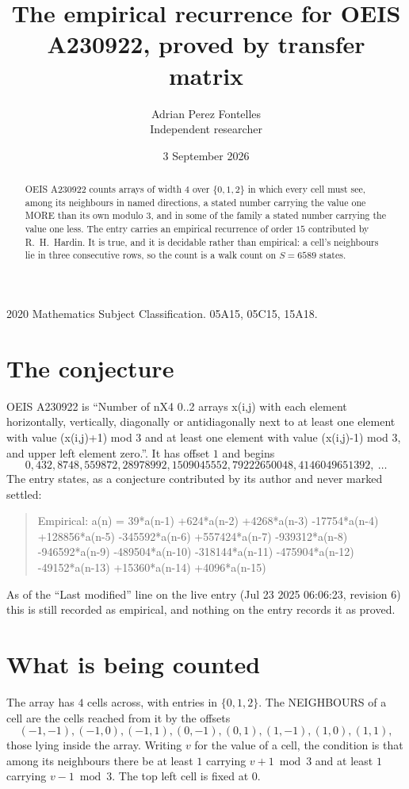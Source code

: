 \documentclass[11pt,a4paper]{article}
\title{The empirical recurrence for OEIS A230922, proved by transfer matrix}
\author{Adrian Perez Fontelles\\ \small Independent researcher}
\date{3 September 2026}
\theoremstyle{plain}
\theoremstyle{definition}
\begin{document}
\maketitle

\begin{abstract}
OEIS A230922 counts arrays of width $4$ over $\{0,1,2\}$ in which every cell must see, among its
neighbours in named directions, a stated number carrying the value one MORE than its own
modulo $3$, and in some of the family a stated number carrying the value one less. The entry
carries an empirical recurrence of order $15$ contributed by R.~H.~Hardin. It is true, and
it is decidable rather than empirical: a cell's neighbours lie in three consecutive rows, so
the count is a walk count on $S=6589$ states.
\end{abstract}

\noindent\small 2020 Mathematics Subject Classification. 05A15, 05C15, 15A18.\normalsize

\section{The conjecture}

OEIS A230922 is ``Number of nX4 0..2 arrays x(i,j) with each element horizontally, vertically, diagonally or antidiagonally next to at least one element with value (x(i,j)+1) mod 3 and at least one element with value (x(i,j)-1) mod 3, and upper left element zero.''. It has offset $1$ and begins
\[
0, 432, 8748, 559872, 28978992, 1509045552, 79222650048, 4146049651392,\ \dots
\]
The entry states, as a conjecture contributed by its author and never marked settled:
\begin{quote}
Empirical: a(n) = 39*a(n-1) +624*a(n-2) +4268*a(n-3) -17754*a(n-4) +128856*a(n-5) -345592*a(n-6) +557424*a(n-7) -939312*a(n-8) -946592*a(n-9) -489504*a(n-10) -318144*a(n-11) -475904*a(n-12) -49152*a(n-13) +15360*a(n-14) +4096*a(n-15)
\end{quote}
As of the ``Last modified'' line on the live entry (Jul 23 2025 06:06:23, revision 6) this is still
recorded as empirical, and nothing on the entry records it as proved.

\section{What is being counted}

The array has $4$ cells across, with entries in $\{0,1,2\}$. The NEIGHBOURS of a cell are the
cells reached from it by the offsets
\[
(-1,-1), (-1,0), (-1,1), (0,-1), (0,1), (1,-1), (1,0), (1,1),
\]
those lying inside the array. Writing $v$ for the value of a cell, the condition is that among
its neighbours there be at least $1$ carrying $v+1 \bmod 3$ and at least $1$ carrying $v-1 \bmod 3$. The top left
cell is fixed at $0$.
\end{document}
